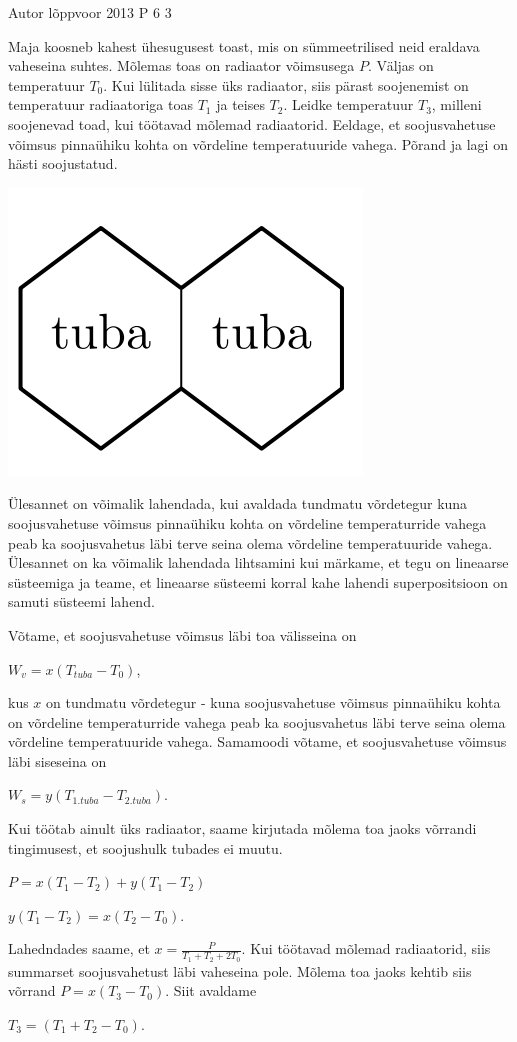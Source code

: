 {Autor} %
{lõppvoor} %
{2013} %
{P 6} %
{3} %
{

\ifStatement
Maja koosneb kahest ühesugusest toast, mis on sümmeetrilised neid eraldava vaheseina suhtes. Mõlemas toas on radiaator võimsusega $P$. Väljas on temperatuur $T_0$. Kui lülitada sisse üks radiaator, siis pärast soojenemist on temperatuur radiaatoriga toas $T_1$ ja teises $T_2$. Leidke temperatuur $T_3$, milleni soojenevad toad, kui töötavad mõlemad radiaatorid. Eeldage, et soojusvahetuse võimsus pinnaühiku kohta on võrdeline temperatuuride vahega. Põrand ja lagi on hästi soojustatud. 
\begin{center}
	\includegraphics[width=0.5\linewidth]{2013-v3p-06-yl.PNG}
\end{center}
\fi

\ifHint
Ülesannet on võimalik lahendada, kui avaldada tundmatu võrdetegur kuna soojusvahetuse võimsus pinnaühiku kohta on võrdeline temperaturride vahega peab ka soojusvahetus läbi terve seina olema võrdeline temperatuuride vahega. Ülesannet on ka võimalik lahendada lihtsamini kui märkame, et tegu on lineaarse süsteemiga ja teame, et lineaarse süsteemi korral kahe lahendi superpositsioon on samuti süsteemi lahend.
\fi

\ifSolution
Võtame, et soojusvahetuse võimsus läbi toa välisseina on
\begin{center}
$W_v = x(T_{tuba} - T_0)$,
\end{center}
kus $x$ on tundmatu võrdetegur - kuna soojusvahetuse võimsus pinnaühiku kohta on võrdeline temperaturride vahega peab ka soojusvahetus läbi terve seina olema võrdeline temperatuuride vahega. Samamoodi võtame, et soojusvahetuse võimsus läbi siseseina on
\begin{center}
$W_s = y(T_{1. tuba} - T_{2. tuba})$.
\end{center}
Kui töötab ainult üks radiaator, saame kirjutada mõlema toa jaoks võrrandi tingimusest, et soojushulk tubades ei muutu.
\begin{center}
$P = x(T_1 - T_2) + y(T_1 - T_2)$
\end{center}
\begin{center}
$y(T_1 - T_2) = x(T_2 - T_0)$.
\end{center}
Lahedndades saame, et $x = \frac{P}{T_1 + T_2 + 2T_0}$. Kui töötavad mõlemad radiaatorid, siis summarset soojusvahetust läbi vaheseina pole. Mõlema toa jaoks kehtib siis võrrand $P = x(T_3 - T_0)$. Siit avaldame
\begin{center}
$T_3 = (T_1 + T_2 - T_0)$.
\end{center}

}
